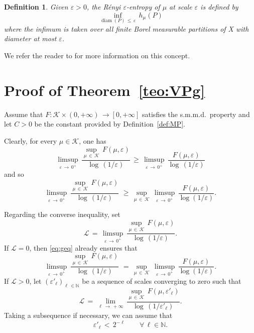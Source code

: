 \documentclass[11pt,a4paper,reqno]{amsart}
\theoremstyle{plain}
\theoremstyle{definition}
\newtheorem{definition}[theorem]{Definition}
\newcommand{\field}[1]{\mathbb{#1}}
\newcommand{\NN}{\field{N}}
\newcommand{\ep} {\varepsilon}
\newcommand{\vep}{\varepsilon}
\newcommand{\cK}{{\mathcal K}}
\newcommand{\diam}{\operatorname{{diam}}}
\begin{document}

\begin{definition}
\emph{Given $\vep>0$, the \emph{Rényi $\vep$-entropy of $\mu$ at scale $\ep$} is defined by
$$\inf_{\diam(P)\, \leq\, \vep} \, h_\mu(P)$$
where the infimum is taken over all finite Borel measurable partitions of X with diameter at most $\vep$.}
\end{definition}
We refer the reader to \cite[Section~3]{GS} for more information on this concept.



\section{Proof of Theorem~\ref{teo:VPg}}\label{se:proofG}

Assume that $F \colon \cK \times (0, +\infty)\, \to [0, +\infty]$ satisfies the s.m.m.d.~property and let $C>0$ be the constant provided by Definition~\ref{def:MP}. 
\smallskip

Clearly, for every $\mu \in \cK$, one has
$$\limsup_{\vep \, \to \, 0^+} \, \frac{\sup_{\mu \, \in \, \cK}\,F(\mu, \vep)}{\log \, (1/\vep)}\, \geq\, \limsup_{\vep \, \to \, 0^+} \, \frac{F(\mu, \vep)}{\log \, (1/\vep)}$$
and so
\begin{equation}\label{eq:geq}
\limsup_{\vep \, \to \, 0^+} \, \frac{\sup_{\mu \, \in \, \cK}\,F(\mu, \vep)}{\log \, (1/\vep)}\,\, \geq\, \sup_{\mu\,\in\,\cK}\,\limsup_{\ep\,\to\,0^+}\,\frac{F(\mu,\ep)}{\log(1/\ep)}.
\end{equation}
\smallskip

Regarding the converse inequality, set
$$\mathcal{L} \, =\, \limsup_{\vep \, \to \, 0^+} \, \frac{\sup_{\mu \, \in \, \cK}\,F(\mu, \vep)}{\log \, (1/\vep)}.$$
If $\mathcal{L}=0$, then \eqref{eq:geq} already ensures that
$$\limsup_{\vep \, \to \, 0^+} \, \frac{\sup_{\mu \, \in \, \cK}\,F(\mu, \vep)}{\log \, (1/\vep)}\,\, =\, \sup_{\mu\,\in\,\cK}\,\limsup_{\ep\,\to\,0^+}\,\frac{F(\mu,\ep)}{\log(1/\ep)}.$$
If $\mathcal{L}>0$,  let $(\ep'_\ell)_{\ell \, \in \mathbb{N}}$ be a sequence of scales converging to zero such that 
\begin{equation*}
\mathcal{L}\,=\, \lim_{\ell\,\to\,+\infty}\,\frac{\sup_{\mu\,\in\,\cK}\, F(\mu,\ep'_\ell)}{\log\,(1/\ep'_\ell)}.
\end{equation*} 
Taking a subsequence if necessary, we can assume that 
$$\ep'_\ell \, < \, 2^{-\ell} \quad \quad \forall\, \ell \in \NN.$$
\end{document}
